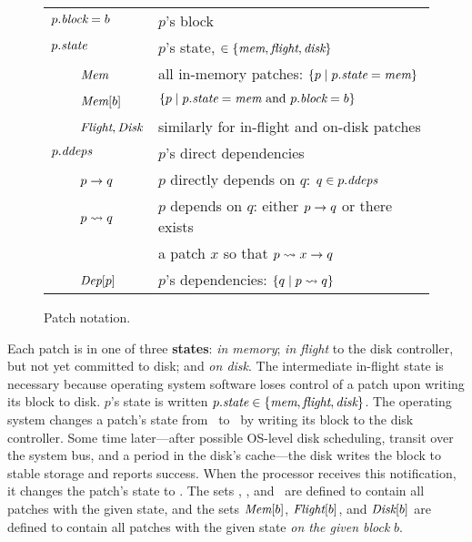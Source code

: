 \begin{figure}
\begin{small}
\begin{tabular}{@{}ll@{}}
$p.\textit{block} = b$ & $p$'s block \\
$p.\textit{state}$ & $p$'s state, $\in \{\textit{mem}, \textit{flight}, \textit{disk}\}$ \\
~~~~$\PMem$ & all in-memory patches: $\{p \mid p.\textit{state} = \textit{mem}\}$ \\
~~~~$\PMem[b]$ & $\{p \mid p.\textit{state} = \textit{mem} \text{ and } p.\textit{block} = b
 \}$ \\
~~~~$\PInf, \PDisk$ & similarly for in-flight and on-disk patches \\
$\PDDepset{p}$ & $p$'s direct dependencies \\
~~~~$p \rightarrow q$ & $p$ directly depends on $q$: $q \in \PDDepset{p}$ \\
~~~~$p \leadsto q$ & $p$ depends on $q$: either $p \rightarrow q$ or there exists \\
       & a patch $x$ so that $p \leadsto x \rightarrow q$ \\
~~~~$\textit{Dep}[p]$ & $p$'s dependencies: $\{ q \mid p \leadsto q \}$ \\
\end{tabular}
\end{small}

\caption{Patch notation.}
\label{f:patchnot}
\end{figure}


Each patch is in one of three \textbf{states}: \emph{in memory}; \emph{in
 flight} to the disk controller, but not yet committed to disk; and
 \emph{on disk}.  The intermediate in-flight state is necessary because
 operating system software loses control of a patch upon writing its block
 to disk.  $p$'s state is written $p.\textit{state} \in \{\textit{mem}, \textit{flight},
 \textit{disk}\}$.  The operating system changes a patch's state from
 \PMemst\ to \PInfst\ by writing its block to the disk controller.  Some
 time later---after possible OS-level disk scheduling, transit over the
 system bus, and a period in the disk's cache---the disk writes the block
 to stable storage and reports success.  When the processor receives this
 notification, it changes the patch's state to \PDiskst.
%
The sets \PMem, \PInf, and \PDisk\ are defined to contain all patches with
 the given state, and the sets $\PMem[b]$, $\PInf[b]$, and $\PDisk[b]$ are
 defined to contain all patches with the given state \emph{on the given
 block} $b$.


